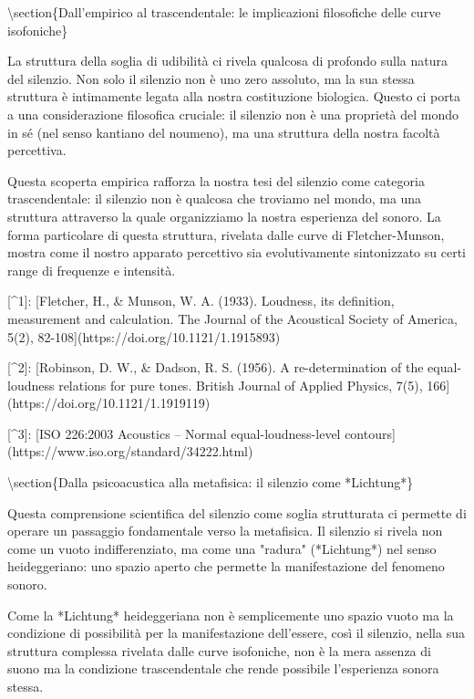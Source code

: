 \documentclass[a4paper,11pt]{article}
\begin{document}
\textbackslash{}section\{Dall'empirico al trascendentale: le implicazioni filosofiche delle curve isofoniche\}

La struttura della soglia di udibilit\`a ci rivela qualcosa di profondo
sulla natura del silenzio. Non solo il silenzio non \`e uno zero assoluto,
ma la sua stessa struttura \`e intimamente legata alla nostra costituzione
biologica. Questo ci porta a una considerazione filosofica cruciale: il
silenzio non \`e una propriet\`a del mondo in s\'e (nel senso kantiano del
noumeno), ma una struttura della nostra facolt\`a percettiva.

Questa scoperta empirica rafforza la nostra tesi del silenzio come
categoria trascendentale: il silenzio non \`e qualcosa che troviamo nel
mondo, ma una struttura attraverso la quale organizziamo la nostra
esperienza del sonoro. La forma particolare di questa struttura,
rivelata dalle curve di Fletcher-Munson, mostra come il nostro apparato
percettivo sia evolutivamente sintonizzato su certi range di frequenze e
intensit\`a.

[\textasciicircum{}1]: [Fletcher, H., \& Munson, W. A. (1933). Loudness, its definition,
    measurement and calculation. The Journal of the Acoustical Society
    of America, 5(2), 82-108](https://doi.org/10.1121/1.1915893)

[\textasciicircum{}2]: [Robinson, D. W., \& Dadson, R. S. (1956). A re-determination of
    the equal-loudness relations for pure tones. British Journal of
    Applied Physics, 7(5), 166](https://doi.org/10.1121/1.1919119)

[\textasciicircum{}3]: [ISO 226:2003 Acoustics -- Normal equal-loudness-level
    contours](https://www.iso.org/standard/34222.html)


\textbackslash{}section\{Dalla psicoacustica alla metafisica: il silenzio come *Lichtung*\}

Questa comprensione scientifica del silenzio come soglia strutturata ci
permette di operare un passaggio fondamentale verso la metafisica. Il
silenzio si rivela non come un vuoto indifferenziato, ma come una
"radura" (*Lichtung*) nel senso heideggeriano: uno spazio aperto che
permette la manifestazione del fenomeno sonoro.

Come la *Lichtung* heideggeriana non \`e semplicemente uno spazio vuoto ma
la condizione di possibilit\`a per la manifestazione dell'essere, cos\`i il
silenzio, nella sua struttura complessa rivelata dalle curve isofoniche,
non \`e la mera assenza di suono ma la condizione trascendentale che rende
possibile l'esperienza sonora stessa.
\end{document}
